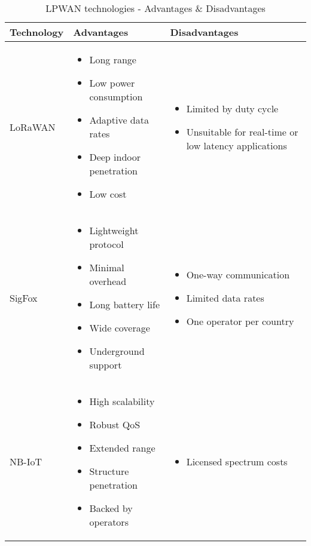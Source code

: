 \begin{table}[H]
\centering
\caption{LPWAN technologies - Advantages \& Disadvantages \cite{sigfox_advantages_disadvantages, nbiot_advantages_disadvantages, ltem_advantages_disadvantages, lorawan_advantages_disadvantages}}
\begin{tabularx}{\textwidth}{l X X}
\toprule
\textbf{Technology} & \textbf{Advantages} & \textbf{Disadvantages} \\
\midrule
LoRaWAN &
\begin{itemize}
	\item Long range
	\item Low power consumption
	\item Adaptive data rates
	\item Deep indoor penetration
	\item Low cost
\end{itemize}
&
\begin{itemize}
	\item Limited by duty cycle
	\item Unsuitable for real-time or low latency applications
\end{itemize}
\\
SigFox &
\begin{itemize}
	\item Lightweight protocol
	\item Minimal overhead
	\item Long battery life
	\item Wide coverage
	\item Underground support
\end{itemize}
&
\begin{itemize}
	\item One-way communication
	\item Limited data rates
	\item One operator per country
\end{itemize}
\\
NB-IoT &
\begin{itemize}
	\item High scalability
	\item Robust QoS
	\item Extended range
	\item Structure penetration
	\item Backed by operators
\end{itemize}
&
\begin{itemize}
	\item Licensed spectrum costs

\end{itemize}
\end{tabularx}
\end{table}
